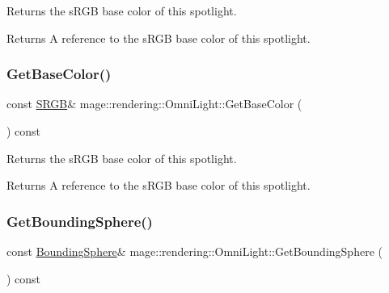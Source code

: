 Returns the s\+R\+GB base color of this spotlight.

\begin{DoxyReturn}{Returns}
A reference to the s\+R\+GB base color of this spotlight. 
\end{DoxyReturn}
\hypertarget{classmage_1_1rendering_1_1_omni_light_a8a9b3b3b4fe42ae97b472b8842684967}{}\label{classmage_1_1rendering_1_1_omni_light_a8a9b3b3b4fe42ae97b472b8842684967} 
\subsubsection{\texorpdfstring{Get\+Base\+Color()}{GetBaseColor()}\hspace{0.1cm}{\footnotesize\ttfamily [2/2]}}
{\footnotesize\ttfamily const \hyperlink{structmage_1_1_s_r_g_b}{S\+R\+GB}\& mage\+::rendering\+::\+Omni\+Light\+::\+Get\+Base\+Color (\begin{DoxyParamCaption}{ }\end{DoxyParamCaption}) const\hspace{0.3cm}{\ttfamily [noexcept]}}

Returns the s\+R\+GB base color of this spotlight.

\begin{DoxyReturn}{Returns}
A reference to the s\+R\+GB base color of this spotlight. 
\end{DoxyReturn}
\hypertarget{classmage_1_1rendering_1_1_omni_light_aaecee74a14aae5015f8bc738727162ee}{}\label{classmage_1_1rendering_1_1_omni_light_aaecee74a14aae5015f8bc738727162ee} 
\subsubsection{\texorpdfstring{Get\+Bounding\+Sphere()}{GetBoundingSphere()}}
{\footnotesize\ttfamily const \hyperlink{classmage_1_1_bounding_sphere}{Bounding\+Sphere}\& mage\+::rendering\+::\+Omni\+Light\+::\+Get\+Bounding\+Sphere (\begin{DoxyParamCaption}{ }\end{DoxyParamCaption}) const\hspace{0.3cm}{\ttfamily [noexcept]}}

